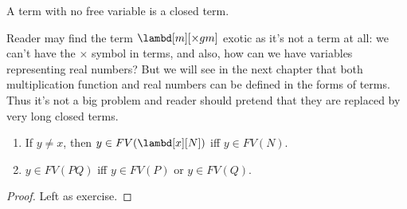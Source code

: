 \documentclass[../../../include/open-logic-section]{subfiles}
\begin{document}
\begin{defn}
  A term with no free variable is a closed term.
\end{defn}

\begin{explain}
  Reader may find the term $\lambd[m][\times g m]$ exotic as it's not
  a term at all: we can't have the $\times$ symbol in terms, and also,
  how can we have variables representing real numbers? But we will see
  in the next chapter that both multiplication function and real
  numbers can be defined in the forms of terms. Thus it's not a big
  problem and reader should pretend that they are replaced by very
  long closed terms.
\end{explain}

\begin{lem}
  \begin{enumerate}
    \item {} If $y \neq x$, then $y \in FV(\lambd[x][N])$ iff $y \in
    FV(N)$.
    \item {} $y \in FV(PQ)$ iff $y \in FV(P)$ or
      $y \in FV(Q)$.
    \end{enumerate}
\end{lem}
\begin{proof}
  Left as exercise.
\end{proof}
\end{document}
